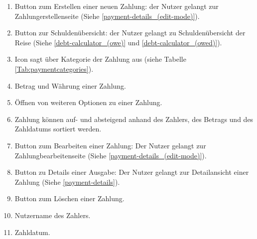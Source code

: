 \begin{enumerate}[label=\protect\circled{\arabic*}]
	\item Button zum Erstellen einer neuen Zahlung: der Nutzer gelangt zur Zahlungerstellenseite (Siehe \ref{payment-details_(edit-mode)}).
	\item Button zur Schuldenübersicht: der Nutzer gelangt zu Schuldenübersicht der Reise (Siehe \ref{debt-calculator_(owe)} und \ref{debt-calculator_(owed)}).
	\item Icon sagt über Kategorie der Zahlung aus (siehe Tabelle \ref{Tab:paymentcategories}).
	\item Betrag und Währung einer Zahlung.
	\item Öffnen von weiteren Optionen zu einer Zahlung.
	\item Zahlung können auf- und absteigend anhand des Zahlers, des Betrags und des Zahldatums sortiert werden.
	\item Button zum Bearbeiten einer Zahlung: Der Nutzer gelangt zur Zahlungbearbeitenseite  (Siehe \ref{payment-details_(edit-mode)}).
	\item Button zu Details einer Ausgabe: Der Nutzer gelangt zur Detailansicht einer Zahlung  (Siehe \ref{payment-details}).
	\item Button zum Löschen einer Zahlung.
	\item Nutzername des Zahlers.
	\item Zahldatum.
\end{enumerate}

